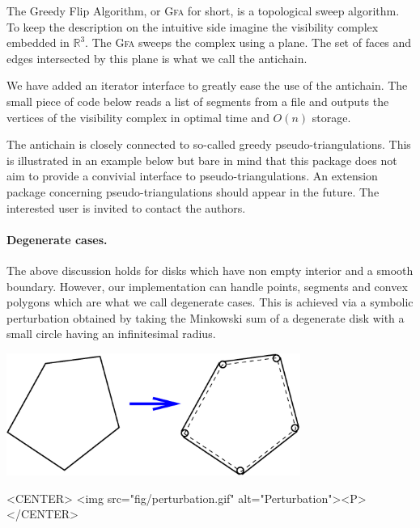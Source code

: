 The Greedy Flip Algorithm, or \textsc{Gfa} for short, is a topological sweep
algorithm.  To keep the description on the intuitive side imagine the visibility
complex embedded in $\mathbb{R}^3$. The \textsc{Gfa} sweeps the complex using a
plane.  The set of faces and edges intersected by this plane is what we call the
antichain.

We have added an iterator interface to greatly ease the use of the antichain.
The small piece of code below reads a list of segments from a file and outputs
the vertices of the visibility complex in optimal time and $O(n)$ storage.


The antichain is closely connected to so-called greedy pseudo-triangulations.
This is illustrated in an example below but bare in mind that this package does
not aim to provide a convivial interface to pseudo-triangulations. An extension
package concerning pseudo-triangulations should appear in the future. The
interested user is invited to contact the authors.

\paragraph{Degenerate cases.} The above discussion holds for disks which have
non empty interior and a smooth boundary. However, our implementation can handle
points, segments and convex polygons which are what we call degenerate cases. 
This is achieved via a symbolic perturbation obtained by taking the Minkowski sum 
of a degenerate disk with a small circle having an infinitesimal radius. 

\begin{ccTexOnly}
    \begin{center}
	\includegraphics[height=4cm]{fig/perturbation.eps}%
    \end{center}
\end{ccTexOnly}

\begin{ccHtmlOnly}
    <CENTER>
        <img src="fig/perturbation.gif" alt="Perturbation"><P>
    </CENTER>
\end{ccHtmlOnly}

